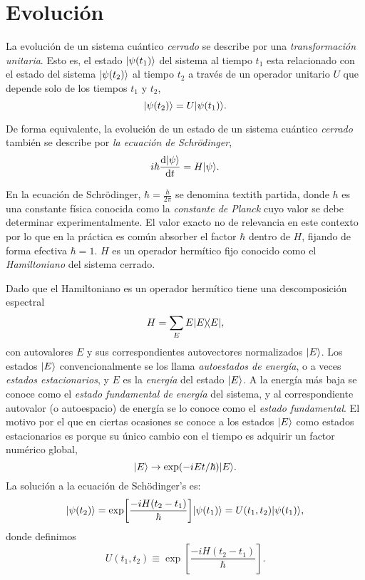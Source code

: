 \section{Evolución}\label{evol}

\begin{postulate}
  La evolución de un sistema cuántico \emph{cerrado} se describe por una 
  \emph{transformación unitaria}. Esto es, el estado $\ket{\psi(t_1)}$ del sistema al tiempo $t_1$ esta relacionado con el estado del sistema $\ket{\psi(t_2)}$ al tiempo 
  $t_2$ a través de un operador unitario $U$ que depende solo de los tiempos $t_1$ y $t_2$, \begin{equation*}
    \ket{\psi(t_2)} = U\ket{\psi(t_1)}.
  \end{equation*}

  De forma equivalente, la evolución de un estado de un sistema cuántico \emph{cerrado} también se describe por \emph{la ecuación de Schr{\"o}dinger}, \begin{equation}
    i\hbar\frac{\mathrm{d}\ket{\psi}}{\mathrm{d}t} = H\ket{\psi}.
    \label{eq:sch-eq}
  \end{equation}
\end{postulate}

En la ecuación de Schr{\"o}dinger, $\hbar=\frac{h}{2\pi}$ se denomina textit{h partida}, donde $h$ es una constante física conocida como la \emph{constante de Planck} cuyo valor se debe determinar experimentalmente. El valor exacto no de relevancia en este contexto por lo que en la práctica es común absorber el factor $\hbar$ dentro de $H$, fijando de forma  efectiva $\hbar = 1$. $H$ es un operador hermítico fijo conocido como el \emph{Hamiltoniano} del sistema cerrado.

Dado que el Hamiltoniano es un operador hermítico tiene una descomposición espectral
\begin{equation}
  H = \sum_E E\ketbra{E}{E}, \label{eq:ham-spec-dec}
\end{equation} con autovalores $E$ y sus correspondientes autovectores normalizados
$\ket{E}$. Los estados $\ket{E}$ convencionalmente se los llama \emph{autoestados de energía}, o a veces \emph{estados estacionarios}, y $E$ es la \emph{energía} del estado $\ket{E}$. A la energía más baja se conoce como el 
\emph{estado fundamental de energía} del sistema, y al  correspondiente autovalor (o autoespacio) de energía se lo conoce como el \emph{estado fundamental}. El motivo por el que en ciertas ocasiones se conoce a los estados $\ket{E}$ como estados estacionarios es porque su único cambio con el tiempo es adquirir un factor numérico global, \begin{equation*}
  \ket{E} \rightarrow \exp(-iEt/\hbar)\ket{E}.
\end{equation*}
La solución a la ecuación de Sch{\"o}dinger's es:
\begin{equation*} \ket{\psi(t_2)} = \exp\left[\frac{-iH(t_2 - t_1)}{\hbar}\right]
    \ket{\psi(t_1)} = U(t_1, t_2)\ket{\psi(t_1)},
\end{equation*} donde definimos \begin{equation}
  U(t_1, t_2) \equiv \exp\left[\frac{-iH(t_2 - t_1)}{\hbar}\right].
  \label{eq:unit-sch-eq}
\end{equation}

